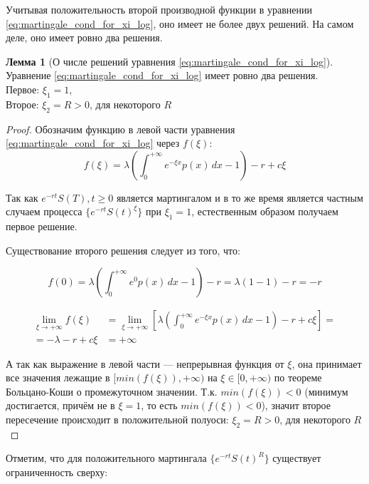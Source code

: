\documentclass[a4paper,12pt]{article}
\theoremstyle{definition}
\newtheorem{lemma}{Лемма}
\begin{document}
Учитывая положительность второй производной функции в уравнении \eqref{eq:martingale_cond_for_xi_log}, оно имеет не более двух решений. На самом деле, оно имеет ровно два решения.
\begin{lemma}[О числе решений уравнения \eqref{eq:martingale_cond_for_xi_log}]\label{thm:solution_for_mart_cond_m1}
Уравнение \eqref{eq:martingale_cond_for_xi_log} имеет ровно два решения. \\
Первое: $\xi_1 = 1$, \\
Второе: $\xi_2 = R > 0$, для некоторого $R$
\end{lemma}
\begin{proof}
Обозначим функцию в левой части уравнения \eqref{eq:martingale_cond_for_xi_log} через $f(\xi)$:
\begin{equation*}
f(\xi) = \lambda \left(\int_{0}^{+\infty} e^{-\xi x} p(x) \,dx - 1\right) - r + c\xi
\end{equation*}

Так как ${e^{-rt} S(T), t \ge 0}$ является мартингалом и в то же время является частным случаем процесса  $\{e^{-rt}S(t)^{\xi}\}$ при $\xi_1 = 1$, естественным образом получаем первое решение.

Существование второго решения следует из того, что:

\begin{equation*}
f(0) = \lambda \left(\int_{0}^{+\infty} e^{0} p(x) \,dx - 1\right) - r = \lambda (1 - 1) - r = -r
\end{equation*}

\begin{equation*}
\begin{split}
\lim_{\xi\to+\infty} f(\xi) &= \lim_{\xi\to+\infty} \left[ \lambda \left(\int_{0}^{+\infty} e^{- \xi x} p(x) \,dx - 1\right) - r + c\xi \right] =\\
= - \lambda - r + c \xi &= +\infty
\end{split}
\end{equation*}

А так как выражение в левой части --- непрерывная функция от $\xi$, она принимает все значения лежащие в $[min(f(\xi)), +\infty)$ на $\xi \in [0, +\infty)$ по теореме Больцано-Коши о промежуточном значении. Т.к. $min(f(\xi)) < 0$ (минимум достигается, причём не в $\xi = 1$, то есть $min(f(\xi)) < 0$), значит второе пересечение происходит в положительной полуоси: $\xi_2 = R > 0$, для некоторого $R$
\end{proof}

Отметим, что для положительного мартингала $\{e^{-rt} S(t)^{R}\}$ существует ограниченность сверху:
\end{document}
